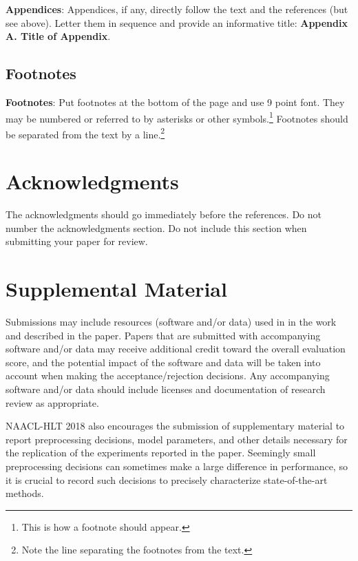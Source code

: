\documentclass[11pt,a4paper]{article}
\begin{document}
{\bf Appendices}: Appendices, if any, directly follow the text and the
references (but see above).  Letter them in sequence and provide an
informative title: {\bf Appendix A. Title of Appendix}.

\subsection{Footnotes}

{\bf Footnotes}: Put footnotes at the bottom of the page and use 9
point font. They may be numbered or referred to by asterisks or other
symbols.\footnote{This is how a footnote should appear.} Footnotes
should be separated from the text by a line.\footnote{Note the line
separating the footnotes from the text.}



\section*{Acknowledgments}

The acknowledgments should go immediately before the references.  Do
not number the acknowledgments section. Do not include this section
when submitting your paper for review.

%
%



\appendix

\section{Supplemental Material}
\label{sec:supplemental}
Submissions may include resources (software and/or data) used in in the work and described in the paper. Papers that are submitted with accompanying software and/or data may receive additional credit toward the overall evaluation score, and the potential impact of the software and data will be taken into account when making the acceptance/rejection decisions. Any accompanying software and/or data should include licenses and documentation of research review as appropriate.


NAACL-HLT 2018 also encourages the submission of supplementary material to report preprocessing decisions, model parameters, and other details necessary for the replication of the experiments reported in the paper. Seemingly small preprocessing decisions can sometimes make a large difference in performance, so it is crucial to record such decisions to precisely characterize state-of-the-art methods. 
\end{document}
